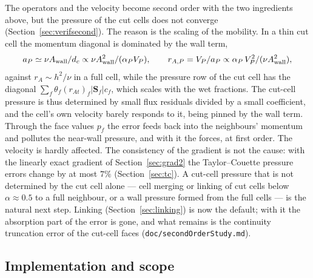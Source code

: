 \documentclass[11pt,a4paper]{article}
\theoremstyle{remark}
\newcommand{\Sf}{\bm{S}_f}
\newcommand{\Aw}{A_{\rm wall}}
\newcommand{\code}[1]{\texttt{#1}}
\begin{document}
The operators and the velocity become second order with the two ingredients above, but the
pressure of the cut cells does not converge (Section~\ref{sec:verifsecond}). The reason is the
scaling of the mobility. In a thin cut cell the momentum diagonal is dominated by the wall term,
\begin{equation}
a_P\simeq\nu\Aw/d_c\propto\nu\Aw^2/(\alpha_PV_P),\qquad
r_{A,P}=V_P/a_P\propto\alpha_P\,V_P^2/(\nu\Aw^2),
\end{equation}
against $r_A\sim h^2/\nu$ in a full cell, while the pressure row of the cut cell has the
diagonal $\sum_f\theta_f(r_{At})_f|\Sf|c_f$, which scales with the wet fractions. The cut-cell
pressure is thus determined by small flux residuals divided by a small coefficient, and the
cell's own velocity barely responds to it, being pinned by the wall term. Through the face
values $p_f$ the error feeds back into the neighbours' momentum and pollutes the near-wall
pressure, and with it the forces, at first order. The velocity is hardly affected. The
consistency of the gradient is not the cause: with the linearly exact gradient of
Section~\ref{sec:grad2} the Taylor--Couette pressure errors change by at most $7\%$
(Section~\ref{sec:tc}). A cut-cell pressure that is not determined by the cut cell alone ---
cell merging or linking of cut cells below $\alpha\approx0.5$ to a full neighbour, or a wall
pressure formed from the full cells --- is the natural next step. Linking
(Section~\ref{sec:linking}) is now the default; with it the absorption part of the error is gone,
and what remains is the continuity truncation error of the cut-cell faces
(\code{doc/secondOrderStudy.md}).

\subsection{Implementation and scope}
\end{document}
